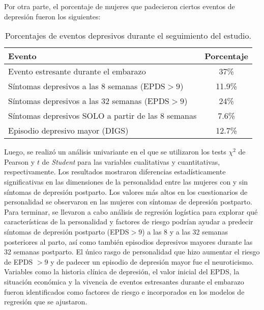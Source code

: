 Por otra parte, el porcentaje de mujeres que padecieron ciertos eventos de depresión fueron los siguientes:

\begin{table} [h!]
	\centering
	\label{tab:4}
	\begin{tabular}{l c}
		\toprule
		\textbf{Evento} & Porcentaje\\
		\midrule
		 Evento estresante durante el embarazo & 37\% \\
		Síntomas depresivos a las 8 semanas (EPDS$>9$) & 11.9\%\\
		Síntomas depresivos a las 32 semanas (EPDS$>9$) & 24\%\\
		Síntomas depresivos SOLO a partir de las 8 semanas & 7.6\%\\
		Episodio depresivo mayor (DIGS) & 12.7\%  \\
		\bottomrule
	\end{tabular}
	\caption{Porcentajes de eventos depresivos durante el seguimiento del estudio.}
\end{table}

Luego, se realizó un análisis univariante en el que se utilizaron los tests $\chi^2$ de Pearson y $t$ de \textit{Student} para las variables cualitativas y cuantitativas, respectivamente. Los resultados mostraron diferencias estadísticamente significativas en las dimensiones de la personalidad entre las mujeres con y sin síntomas de depresión postparto. Los valores más altos en los cuestionarios de personalidad se observaron en las mujeres con síntomas de depresión postparto. \\

Para terminar, se llevaron a cabo análisis de regresión logística para explorar qué características de la personalidad y factores de riesgo podrían ayudar a predecir síntomas de depresión postparto (EPDS$>9$) a las 8 y a las 32 semanas posteriores al parto, así como también episodios depresivos mayores durante las 32 semanas postparto. El único rasgo de personalidad que hizo aumentar el riesgo de EPDS $>9$ y de padecer un episodio de depresión mayor fue el neuroticismo. Variables como la historia clínica de depresión, el valor inicial del EPDS, la situación económica y la vivencia de eventos estresantes durante el embarazo fueron identificados como factores de riesgo e incorporados en los modelos de regresión que se ajustaron.






